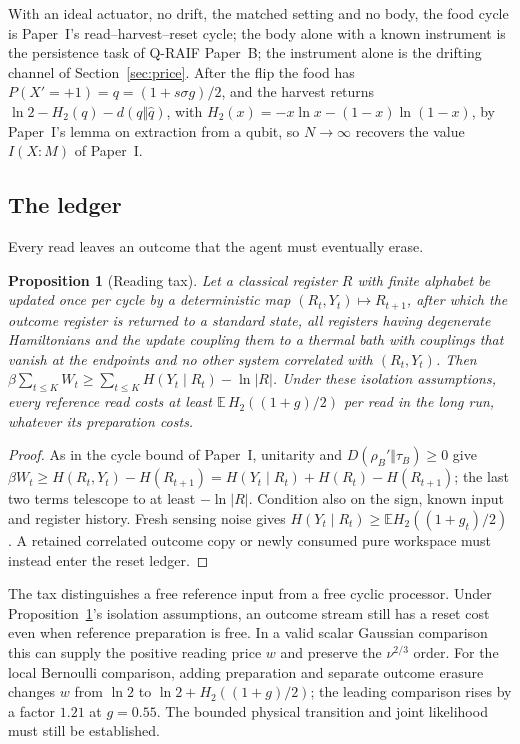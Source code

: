 \documentclass[12pt]{article}
\newtheorem{proposition}[theorem]{Proposition}
\theoremstyle{definition}
\newcommand{\E}{\mathbb E}
\begin{document}
With an ideal actuator, no drift, the matched setting and no body, the food cycle is Paper~I's read--harvest--reset cycle; the body alone with a known instrument is the persistence task of Q-RAIF Paper~B; the instrument alone is the drifting channel of Section~\ref{sec:price}. After the flip the food has $P(X'=+1)=q=(1+s\sigma g)/2$, and the harvest returns $\ln2-H_2(q)-d(q\Vert\hat q)$, with $H_2(x)=-x\ln x-(1-x)\ln(1-x)$, by Paper~I's lemma on extraction from a qubit, so $N\to\infty$ recovers the value $I(X{:}M)$ of Paper~I.

\subsection{The ledger}
\label{subsec:J_ledger}

Every read leaves an outcome that the agent must eventually erase.

\begin{proposition}[Reading tax]
\label{prop:tax}
Let a classical register $R$ with finite alphabet be updated once per cycle by a deterministic map $(R_t,Y_t)\mapsto R_{t+1}$, after which the outcome register is returned to a standard state, all registers having degenerate Hamiltonians and the update coupling them to a thermal bath with couplings that vanish at the endpoints and no other system correlated with $(R_t,Y_t)$. Then $\beta\sum_{t\le K}W_t\ge\sum_{t\le K}H(Y_t\mid R_t)-\ln|R|$. Under these isolation assumptions, every reference read costs at least $\E\,H_2((1+g)/2)$ per read in the long run, whatever its preparation costs.
\end{proposition}

\begin{proof}
As in the cycle bound of Paper~I, unitarity and $D(\rho_B'\Vert\tau_B)\ge0$ give $\beta W_t\ge H(R_t,Y_t)-H(R_{t+1})=H(Y_t\mid R_t)+H(R_t)-H(R_{t+1})$; the last two terms telescope to at least $-\ln|R|$. Condition also on the sign, known input and register history. Fresh sensing noise gives $H(Y_t\mid R_t)\ge\E H_2((1+g_t)/2)$. A retained correlated outcome copy or newly consumed pure workspace must instead enter the reset ledger.
\end{proof}

The tax distinguishes a free reference input from a free cyclic processor. Under Proposition~\ref{prop:tax}'s isolation assumptions, an outcome stream still has a reset cost even when reference preparation is free. In a valid scalar Gaussian comparison this can supply the positive reading price $w$ and preserve the $\nu^{2/3}$ order. For the local Bernoulli comparison, adding preparation and separate outcome erasure changes $w$ from $\ln2$ to $\ln2+H_2((1+g)/2)$; the leading comparison rises by a factor $1.21$ at $g=0.55$. The bounded physical transition and joint likelihood must still be established.
\end{document}
